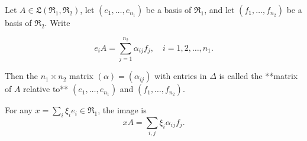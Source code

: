 Let $A \in \mathfrak{L}(\mathfrak{R}_1, \mathfrak{R}_2)$, let $(e_1, \dots, e_{n_1})$ be a basis of $\mathfrak{R}_1$, and let $(f_1, \dots, f_{n_2})$ be a basis of $\mathfrak{R}_2$. Write

$$e_i A = \sum_{j=1}^{n_2} \alpha_{ij} f_j, \quad i = 1, 2, \dots, n_1.$$

Then the $n_1 \times n_2$ matrix $(\alpha) = (\alpha_{ij})$ with entries in $\Delta$ is called the **matrix of $A$ relative to** $(e_1, \dots, e_{n_1})$ and $(f_1, \dots, f_{n_2})$.

For any $x = \sum_i \xi_i e_i \in \mathfrak{R}_1$, the image is
$$xA = \sum_{i,j} \xi_i \alpha_{ij} f_j.$$
